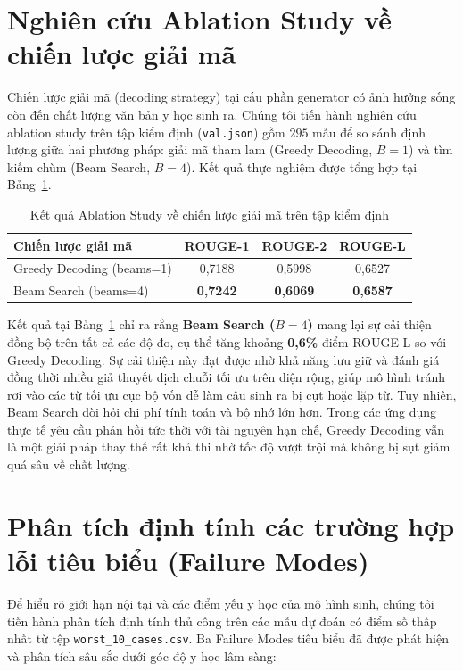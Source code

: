\section{Nghiên cứu Ablation Study về chiến lược giải mã}
Chiến lược giải mã (decoding strategy) tại cấu phần generator có ảnh hưởng sống còn đến chất lượng văn bản y học sinh ra. Chúng tôi tiến hành nghiên cứu ablation study trên tập kiểm định (\texttt{val.json}) gồm $295$ mẫu để so sánh định lượng giữa hai phương pháp: giải mã tham lam (Greedy Decoding, $B=1$) và tìm kiếm chùm (Beam Search, $B=4$). Kết quả thực nghiệm được tổng hợp tại Bảng~\ref{tab:ablation_decoding}.

\begin{table}[H]
\centering
\caption{Kết quả Ablation Study về chiến lược giải mã trên tập kiểm định}
\label{tab:ablation_decoding}
\begin{tabular}{lccc}
\toprule
\textbf{Chiến lược giải mã} & \textbf{ROUGE-1} & \textbf{ROUGE-2} & \textbf{ROUGE-L} \\
\midrule
Greedy Decoding (beams=1) & 0,7188 & 0,5998 & 0,6527 \\
Beam Search (beams=4) & \textbf{0,7242} & \textbf{0,6069} & \textbf{0,6587} \\
\bottomrule
\end{tabular}
\end{table}

Kết quả tại Bảng~\ref{tab:ablation_decoding} chỉ ra rằng \textbf{Beam Search ($B=4$)} mang lại sự cải thiện đồng bộ trên tất cả các độ đo, cụ thể tăng khoảng \textbf{0,6\%} điểm ROUGE-L so với Greedy Decoding. Sự cải thiện này đạt được nhờ khả năng lưu giữ và đánh giá đồng thời nhiều giả thuyết dịch chuỗi tối ưu trên diện rộng, giúp mô hình tránh rơi vào các từ tối ưu cục bộ vốn dễ làm câu sinh ra bị cụt hoặc lặp từ. Tuy nhiên, Beam Search đòi hỏi chi phí tính toán và bộ nhớ lớn hơn. Trong các ứng dụng thực tế yêu cầu phản hồi tức thời với tài nguyên hạn chế, Greedy Decoding vẫn là một giải pháp thay thế rất khả thi nhờ tốc độ vượt trội mà không bị sụt giảm quá sâu về chất lượng.

\section{Phân tích định tính các trường hợp lỗi tiêu biểu (Failure Modes)}
Để hiểu rõ giới hạn nội tại và các điểm yếu y học của mô hình sinh, chúng tôi tiến hành phân tích định tính thủ công trên các mẫu dự đoán có điểm số thấp nhất từ tệp \texttt{worst\_10\_cases.csv}. Ba Failure Modes tiêu biểu đã được phát hiện và phân tích sâu sắc dưới góc độ y học lâm sàng:

